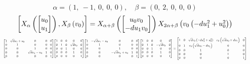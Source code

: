 \documentclass[11pt]{article}
\theoremstyle{definition}
\begin{document}
\[
\alpha = \left( 1, \  -1, \  0, \  0, \  0\right), \quad \beta = \left( 0, \  2, \  0, \  0, \  0\right)
\]
\[
\scaletoalign{\textwidth}{\left[ X_{\alpha}\left(\left[\begin{matrix}u_{0}\\u_{1}\end{matrix}\right]\right), X_{\beta}\left(v_{0}\right) \right] = X_{\alpha + \beta}\left(\left[\begin{matrix}u_{0} v_{0}\\- d u_{1} v_{0}\end{matrix}\right]\right) X_{2\alpha + \beta}\left(v_{0} \left(- d u_{1}^{2} + u_{0}^{2}\right)\right)}
\]
\[
\scaletoalign{\textwidth}{{\left[\begin{matrix}1 & \sqrt{d} u_{1} + u_{0} & 0 & 0 & 0\\0 & 1 & 0 & 0 & 0\\0 & 0 & 1 & 0 & 0\\0 & 0 & \sqrt{d} u_{1} - u_{0} & 1 & 0\\0 & 0 & 0 & 0 & 1\end{matrix}\right]} {\left[\begin{matrix}1 & 0 & 0 & 0 & 0\\0 & 1 & 0 & \sqrt{d} v_{0} & 0\\0 & 0 & 1 & 0 & 0\\0 & 0 & 0 & 1 & 0\\0 & 0 & 0 & 0 & 1\end{matrix}\right]} {\left[\begin{matrix}1 & - \sqrt{d} u_{1} - u_{0} & 0 & 0 & 0\\0 & 1 & 0 & 0 & 0\\0 & 0 & 1 & 0 & 0\\0 & 0 & - \sqrt{d} u_{1} + u_{0} & 1 & 0\\0 & 0 & 0 & 0 & 1\end{matrix}\right]} {\left[\begin{matrix}1 & 0 & 0 & 0 & 0\\0 & 1 & 0 & - \sqrt{d} v_{0} & 0\\0 & 0 & 1 & 0 & 0\\0 & 0 & 0 & 1 & 0\\0 & 0 & 0 & 0 & 1\end{matrix}\right]} = {\left[\begin{matrix}1 & 0 & \sqrt{d} v_{0} \left(- d u_{1}^{2} + u_{0}^{2}\right) & v_{0} \left(\sqrt{d} u_{0} + d u_{1}\right) & 0\\0 & 1 & v_{0} \left(\sqrt{d} u_{0} - d u_{1}\right) & 0 & 0\\0 & 0 & 1 & 0 & 0\\0 & 0 & 0 & 1 & 0\\0 & 0 & 0 & 0 & 1\end{matrix}\right]}}
\]
\end{document}
